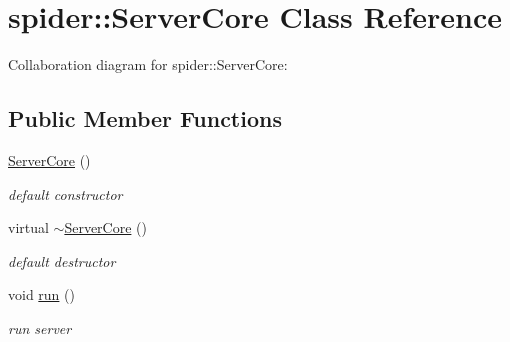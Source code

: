 \hypertarget{classspider_1_1_server_core}{}\section{spider\+:\+:Server\+Core Class Reference}
\label{classspider_1_1_server_core}


Collaboration diagram for spider\+:\+:Server\+Core\+:
\subsection*{Public Member Functions}
\begin{DoxyCompactItemize}
\item 
\mbox{\label{classspider_1_1_server_core_a12254a1286172b54c2e20d613e5e4654}} 
\hyperlink{classspider_1_1_server_core_a12254a1286172b54c2e20d613e5e4654}{Server\+Core} ()
\begin{DoxyCompactList}\small\item\em default constructor \end{DoxyCompactList}\item 
\mbox{\label{classspider_1_1_server_core_a47006cce5446be55c183bc72602666a7}} 
virtual \hyperlink{classspider_1_1_server_core_a47006cce5446be55c183bc72602666a7}{$\sim$\+Server\+Core} ()
\begin{DoxyCompactList}\small\item\em default destructor \end{DoxyCompactList}\item 
\mbox{\label{classspider_1_1_server_core_a9700fa2c8e439a791dd93a537334c74e}} 
void \hyperlink{classspider_1_1_server_core_a9700fa2c8e439a791dd93a537334c74e}{run} ()
\begin{DoxyCompactList}\small\item\em run server \end{DoxyCompactList}\end{DoxyCompactItemize}
